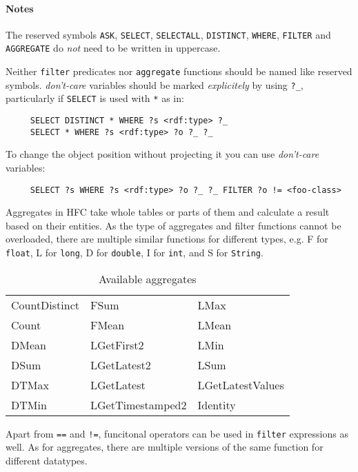 \paragraph{Notes}

The reserved symbols \texttt{ASK}, \texttt{SELECT}, \texttt{SELECTALL},
\texttt{DISTINCT}, \texttt{WHERE}, \texttt{FILTER} and \texttt{AGGREGATE}
do \emph{not} need to be written in uppercase.

Neither \texttt{filter} predicates nor \texttt{aggregate} functions should be named like reserved symbols.
\emph{don't-care} variables should be marked \emph{explicitely} by using
\verb|?_|, particularly if \texttt{SELECT} is used with \verb|*| as in:
\begin{verbatim}
     SELECT DISTINCT * WHERE ?s <rdf:type> ?_
     SELECT * WHERE ?s <rdf:type> ?o ?_ ?_
\end{verbatim}
To change the object position without projecting it you can use \emph{don't-care} variables:
\begin{verbatim}
     SELECT ?s WHERE ?s <rdf:type> ?o ?_ ?_ FILTER ?o != <foo-class>
\end{verbatim}

Aggregates in HFC take whole tables or parts of them and calculate a result based on their entities. As the type of aggregates and filter functions cannot be overloaded, there are multiple similar functions for different types, e.g. F for \texttt{float}, L for \texttt{long}, D for \texttt{double}, I
for \texttt{int}, and S for \texttt{String}.

\begin{table}[htbp]
  \centering
 \begin{tabular}{lll}
   CountDistinct&  FSum&             LMax\\
   Count&          FMean&            LMean\\
   DMean&          LGetFirst2&       LMin\\
   DSum&           LGetLatest2&      LSum\\
   DTMax&          LGetLatest&       LGetLatestValues\\
   DTMin&          LGetTimestamped2& Identity     \\
 \end{tabular}
  \caption{Available aggregates}
  \label{tab:hfcaggregates}
\end{table}

Apart from \verb|==| and \verb|!=|, funcitonal operators can be used in \texttt{filter} expressions as well. As for aggregates, there are multiple versions of the same function for different datatypes.

